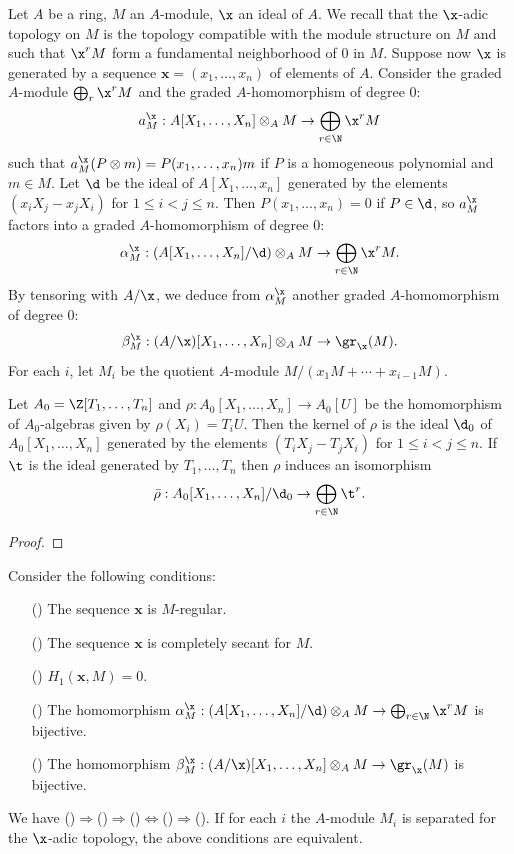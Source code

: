 Let $A$ be a ring, $M$ an $A$-module, $\x$ an ideal of $A$. We recall that the $\x$-adic topology on $M$ is the topology compatible with the module structure on $M$ and such that $\x^rM$ form a fundamental neighborhood of $0$ in $M$. Suppose now $\x$ is generated by a sequence $\bm{x}=(x_1,\dots,x_n)$ of elements of $A$. Consider the graded $A$-module $\bigoplus_r\x^rM$ and the graded $A$-homomorphism of degree $0$:
\[a_M^\x:A[X_1,\dots,X_n]\otimes_AM\to\bigoplus_{r\in\N}\x^rM\] 
such that $a_M^\x(P\otimes m)=P(x_1,\dots,x_n)m$ if $P$ is a homogeneous polynomial and $m\in M$. Let $\d$ be the ideal of $A[X_1,\dots,x_n]$ generated by the elements $(x_iX_j-x_jX_i)$ for $1\leq i<j\leq n$. Then $P(x_1,\dots,x_n)=0$ if $P\in\d$, so $a_M^\x$ factors into a graded $A$-homomorphism of degree $0$:
\[\alpha_M^\x:(A[X_1,\dots,X_n]/\d)\otimes_AM\to\bigoplus_{r\in\N}\x^rM.\]
By tensoring with $A/\x$, we deduce from $\alpha_M^\x$ another graded $A$-homomorphism of degree $0$:
\[\beta_M^\x:(A/\x)[X_1,\dots,X_n]\otimes_AM\to\gr_\x(M).\]
For each $i$, let $M_i$ be the quotient $A$-module $M/(x_1M+\cdots+x_{i-1}M)$.
\begin{lemma}\label{polynomial ring iterated multiplication map kernel char}
Let $A_0=\Z[T_1,\dots,T_n]$ and $\rho:A_0[X_1,\dots,X_n]\to A_0[U]$ be the homomorphism of $A_0$-algebras given by $\rho(X_i)=T_iU$. Then the kernel of $\rho$ is the ideal $\d_0$ of $A_0[X_1,\dots,X_n]$ generated by the elements $(T_iX_j-T_jX_i)$ for $1\leq i<j\leq n$. If $\t$ is the ideal generated by $T_1,\dots,T_n$ then $\rho$ induces an isomorphism
\[\bar{\rho}:A_0[X_1,\dots,X_n]/\d_0\to\bigoplus_{r\in\N}\t^r.\] 
\end{lemma}
\begin{proof}

\end{proof}
\begin{theorem}\label{Koszul complex completely secant annd regular relation}
Consider the following conditions:
\begin{itemize}
\item[(\rmnum{1})] The sequence $\bm{x}$ is $M$-regular.
\item[(\rmnum{2})] The sequence $\bm{x}$ is completely secant for $M$.
\item[(\rmnum{3})] $H_1(\bm{x},M)=0$.
\item[(\rmnum{4})] The homomorphism $\alpha_M^\x:(A[X_1,\dots,X_n]/\d)\otimes_AM\to\bigoplus_{r\in\N}\x^rM$ is bijective.
\item[(\rmnum{5})] The homomorphism $\beta_M^\x:(A/\x)[X_1,\dots,X_n]\otimes_AM\to\gr_\x(M)$ is bijective.
\end{itemize}
We have ()$\Rightarrow$()$\Rightarrow$()$\Leftrightarrow$()$\Rightarrow$(). If for each $i$ the $A$-module $M_i$ is separated for the $\x$-adic topology, the above conditions are equivalent. 
\end{theorem}
